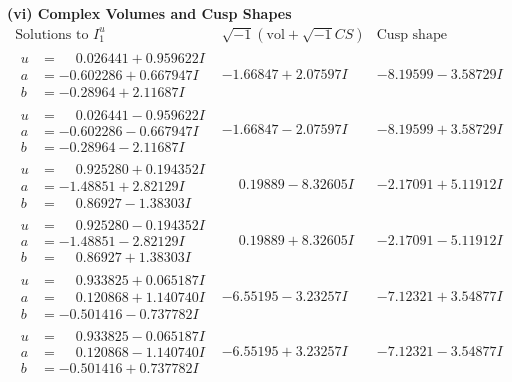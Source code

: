 \documentclass[1p]{elsarticle_modified}
\theoremstyle{definition}
\newcommand{\I}{\sqrt{-1}}
\begin{document}
\newpage\flushleft \textbf{(vi) Complex Volumes and Cusp Shapes}
$$\begin{array}{c|c|c}  
\text{Solutions to }I^u_{1}& \I (\text{vol} + \sqrt{-1}CS) & \text{Cusp shape}\\
 \hline 
\begin{aligned}
u &= \phantom{-}0.026441 + 0.959622 I \\
a &= -0.602286 + 0.667947 I \\
b &= -0.28964 + 2.11687 I\end{aligned}
 & -1.66847 + 2.07597 I & -8.19599 - 3.58729 I \\ \hline\begin{aligned}
u &= \phantom{-}0.026441 - 0.959622 I \\
a &= -0.602286 - 0.667947 I \\
b &= -0.28964 - 2.11687 I\end{aligned}
 & -1.66847 - 2.07597 I & -8.19599 + 3.58729 I \\ \hline\begin{aligned}
u &= \phantom{-}0.925280 + 0.194352 I \\
a &= -1.48851 + 2.82129 I \\
b &= \phantom{-}0.86927 - 1.38303 I\end{aligned}
 & \phantom{-}0.19889 - 8.32605 I & -2.17091 + 5.11912 I \\ \hline\begin{aligned}
u &= \phantom{-}0.925280 - 0.194352 I \\
a &= -1.48851 - 2.82129 I \\
b &= \phantom{-}0.86927 + 1.38303 I\end{aligned}
 & \phantom{-}0.19889 + 8.32605 I & -2.17091 - 5.11912 I \\ \hline\begin{aligned}
u &= \phantom{-}0.933825 + 0.065187 I \\
a &= \phantom{-}0.120868 + 1.140740 I \\
b &= -0.501416 - 0.737782 I\end{aligned}
 & -6.55195 - 3.23257 I & -7.12321 + 3.54877 I \\ \hline\begin{aligned}
u &= \phantom{-}0.933825 - 0.065187 I \\
a &= \phantom{-}0.120868 - 1.140740 I \\
b &= -0.501416 + 0.737782 I\end{aligned}
 & -6.55195 + 3.23257 I & -7.12321 - 3.54877 I \\ \hline\begin{aligned}

\end{aligned}
\end{array}$$
\end{document}
